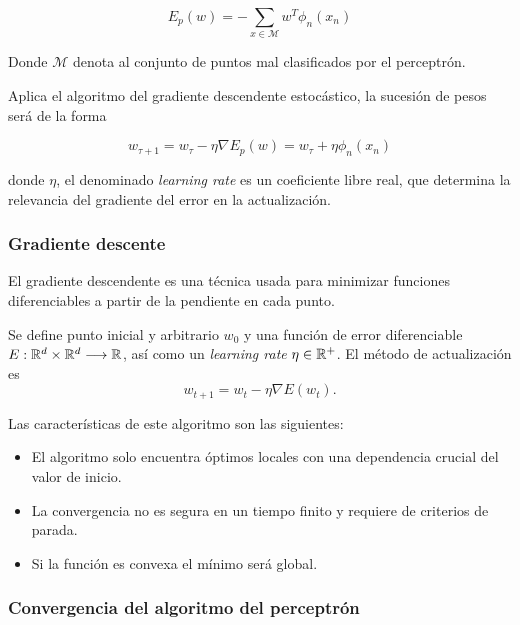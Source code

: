 \begin{equation}
    E_p(w) = - \sum_{x \in \mathcal M} w^T \phi_n (x_n)
\end{equation}

Donde $\mathcal M$ denota al conjunto de puntos mal clasificados por el perceptrón.

Aplica el algoritmo del gradiente descendente estocástico, la sucesión de pesos será de la forma

\begin{equation}
    w_{\tau+1} = 
    w_{\tau} - \eta \nabla E_p(w)
     = 
     w_{\tau} + \eta \phi_n (x_n)
\end{equation}

donde $\eta$, el denominado  \textit{learning rate}
es un coeficiente libre real, que determina la relevancia del gradiente del error en la actualización. 

\subsubsection{Gradiente descente}  

El gradiente descendente es una técnica usada para minimizar funciones diferenciables
a partir de la pendiente en cada punto. 

Se define punto inicial y arbitrario $w_0$ y una función de error diferenciable
$E: \mathbb{R}^d \times \mathbb{R}^d \longrightarrow \mathbb{R}$, así como un \textit{learning rate} 
$\eta \in \mathbb{R}^+$. 
El método de actualización es 
\begin{equation}
    w_{t+1}  = w_t - \eta \nabla E(w_t).
\end{equation}

Las características de este algoritmo son las siguientes: 

\begin{itemize}
    \item El algoritmo solo encuentra óptimos locales con una dependencia crucial del valor de inicio. 
    \item La convergencia no es segura en un tiempo finito y requiere de criterios de parada. 
    \item Si la función es convexa el mínimo será global. 
\end{itemize}

\subsubsection{Convergencia del algoritmo del perceptrón}  

